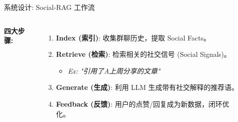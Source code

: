 \documentclass[aspectratio=169]{beamer}
\begin{document}
\begin{frame}{系统设计: Social-RAG 工作流}
    \begin{columns}
        \textbf{四大步骤:}
        \begin{enumerate}
            \item \textbf{Index (索引)}: 
            \newline 收集群聊历史，提取 Social Facts。
            \item \textbf{Retrieve (检索)}: 
            \newline 检索相关的社交信号 (Social Signals)。
            \begin{itemize}
                \item \textit{Ex: "引用了A上周分享的文章"}
            \end{itemize}
            \item \textbf{Generate (生成)}: 
            \newline 利用 LLM 生成带有社交解释的推荐语。
            \item \textbf{Feedback (反馈)}: 
            \newline 用户的点赞/回复成为新数据，闭环优化。
        \end{enumerate}
        
        \begin{center}
        \end{center}
    \end{columns}
\end{frame}
\end{document}
